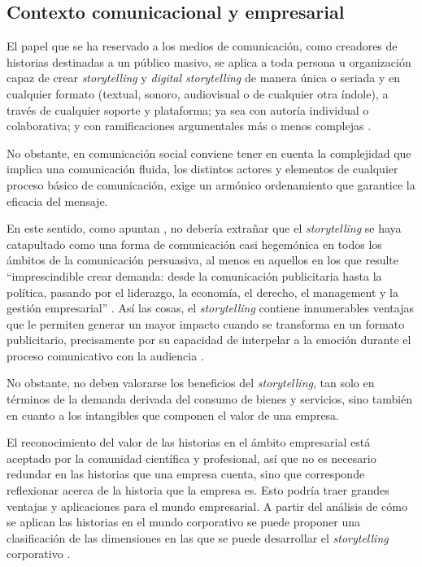 \documentclass[spanish]{textolivre}
\begin{document}
\subsection{Contexto comunicacional y empresarial }\label{sec-fmt-manuscrito}
El papel que se ha reservado a los medios de comunicación, como creadores de historias destinadas a un público masivo, se aplica a toda persona u organización capaz de crear \textit{storytelling} y \textit{digital storytelling} de manera única o seriada y en cualquier formato (textual, sonoro, audiovisual o de cualquier otra índole), a través de cualquier soporte y plataforma; ya sea con autoría individual o colaborativa; y con ramificaciones argumentales más o menos complejas \cite{perez_garcia_digital_2020}.

No obstante, en comunicación social conviene tener en cuenta la complejidad que implica una comunicación fluida, los distintos actores y elementos de cualquier proceso básico de comunicación, exige un armónico ordenamiento que garantice la eficacia del mensaje.

En este sentido, como apuntan \textcite{ferres_communication_2017}, no debería extrañar que el \textit{storytelling} se haya catapultado como una forma de comunicación casi hegemónica en todos los ámbitos de la comunicación persuasiva, al menos en aquellos en los que resulte “imprescindible crear demanda: desde la comunicación publicitaria hasta la política, pasando por el liderazgo, la economía, el derecho, el management y la gestión empresarial” \cite[p. 59]{ferres_communication_2017}. Así las cosas, el \textit{storytelling} contiene innumerables ventajas que le permiten generar un mayor impacto cuando se transforma en un formato publicitario, precisamente por su capacidad de interpelar a la emoción durante el proceso comunicativo con la audiencia \cite{Herrero_claves_2015}.

No obstante, no deben valorarse los beneficios del \textit{storytelling}, tan solo en términos de la demanda derivada del consumo de bienes y servicios, sino también en cuanto a los intangibles que componen el valor de una empresa.

El reconocimiento del valor de las historias en el ámbito empresarial está aceptado por la comunidad científica y profesional, así que no es necesario redundar en las historias que una empresa cuenta, sino que corresponde reflexionar acerca de la historia que la empresa es. Esto podría traer grandes ventajas y aplicaciones para el mundo empresarial. A partir del análisis de cómo se aplican las historias en el mundo corporativo se puede proponer una clasificación de las dimensiones en las que se puede desarrollar el \textit{storytelling} corporativo \cite[p. 197]{atamara-rojas_storytelling_2020}.
\end{document}
